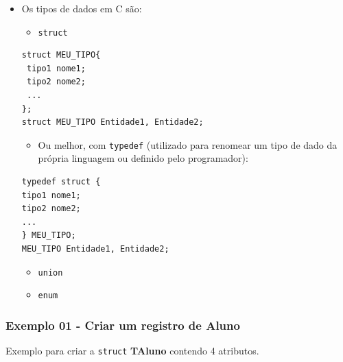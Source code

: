 \documentclass[12pt,a4paper]{article}
\providecommand{\tightlist}{%
      \setlength{\itemsep}{0pt}\setlength{\parskip}{0pt}}
\begin{document}
    \begin{itemize}
\item
  Os tipos de dados em C são:

  \begin{itemize}
  \tightlist
  \item
    \texttt{struct}
  \end{itemize}

\begin{verbatim}
struct MEU_TIPO{ 
 tipo1 nome1; 
 tipo2 nome2; 
 ... 
};
struct MEU_TIPO Entidade1, Entidade2; 
\end{verbatim}

  \begin{itemize}
  \tightlist
  \item
    Ou melhor, com \texttt{typedef} (utilizado para renomear um tipo de
    dado da própria linguagem ou definido pelo programador):
  \end{itemize}

\begin{verbatim}
typedef struct { 
tipo1 nome1; 
tipo2 nome2; 
... 
} MEU_TIPO;
MEU_TIPO Entidade1, Entidade2; 
\end{verbatim}

  \begin{itemize}
  \tightlist
  \item
    \texttt{union}
  \item
    \texttt{enum}
  \end{itemize}
\end{itemize}

    \hypertarget{exemplo-01---criar-um-registro-de-aluno}{%
\subsubsection{Exemplo 01 - Criar um registro de
Aluno}\label{exemplo-01---criar-um-registro-de-aluno}}

Exemplo para criar a \texttt{struct} \textbf{TAluno} contendo 4
atributos.
\end{document}
